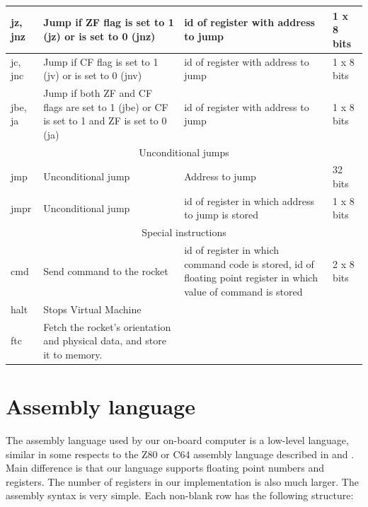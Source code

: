 \documentclass[oneside]{book}
\begin{document}
\begin{longtable}{ |p{2.5cm}||p{3cm}|p{3cm}|p{2cm}| }
 \hline
jz, jnz & Jump if ZF flag is set to 1 (jz) or is set to 0 (jnz) & id of register with address to jump & 1 x 8 bits \\
\hline

jc, jnc & Jump if CF flag is set to 1 (jv) or is set to 0 (jnv) & id of register with address to jump & 1 x 8 bits \\
\hline

jbe, ja & Jump if both ZF and CF flags are set to 1 (jbe) or CF is set to 1 and ZF is set to 0 (ja) & id of register with address to jump & 1 x 8 bits \\
\hline

\hline
   \multicolumn{4}{|c|}{Unconditional jumps} \\
 \hline

jmp & Unconditional jump & Address to jump & 32 bits \\
\hline

jmpr & Unconditional jump & id of register in which address to jump is stored & 1 x 8 bits \\
\hline

\hline
   \multicolumn{4}{|c|}{Special instructions} \\
 \hline
cmd & Send command to the rocket & id of register in which command code is stored, id of floating point register in which value of command is stored & 2 x 8 bits \\
\hline

halt & Stops Virtual Machine & & \\

\hline
ftc & Fetch the rocket's orientation and physical data, and store it to memory. & & \\
\hline

\end{longtable}

\section{Assembly language}

The assembly language used by our on-board computer is a low-level language, similar in some respects to the Z80 or C64 assembly language described in \cite{z80} and \cite{mos}. Main difference is that our language supports floating point numbers and registers. The number of registers in our implementation is also much larger. The assembly syntax is very simple. Each non-blank row has the following structure:
\end{document}
